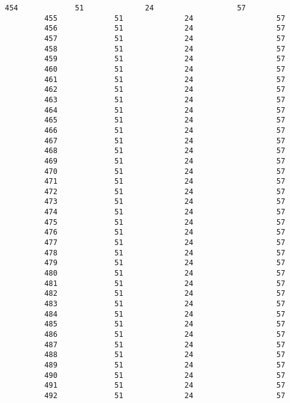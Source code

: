 \documentclass{article}
\begin{document}
\begin{Verbatim}[commandchars=\\\{\}]
         454             51              24                   57   
         455             51              24                   57   
         456             51              24                   57   
         457             51              24                   57   
         458             51              24                   57   
         459             51              24                   57   
         460             51              24                   57   
         461             51              24                   57   
         462             51              24                   57   
         463             51              24                   57   
         464             51              24                   57   
         465             51              24                   57   
         466             51              24                   57   
         467             51              24                   57   
         468             51              24                   57   
         469             51              24                   57   
         470             51              24                   57   
         471             51              24                   57   
         472             51              24                   57   
         473             51              24                   57   
         474             51              24                   57   
         475             51              24                   57   
         476             51              24                   57   
         477             51              24                   57   
         478             51              24                   57   
         479             51              24                   57   
         480             51              24                   57   
         481             51              24                   57   
         482             51              24                   57   
         483             51              24                   57   
         484             51              24                   57   
         485             51              24                   57   
         486             51              24                   57   
         487             51              24                   57   
         488             51              24                   57   
         489             51              24                   57   
         490             51              24                   57   
         491             51              24                   57   
         492             51              24                   57   

\end{Verbatim}
\end{document}
